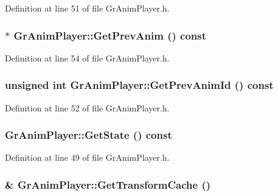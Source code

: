 \begin{CompactItemize}
Definition at line 51 of file GrAnimPlayer.h.\hypertarget{class_gr_anim_player_a549030741fea082faa485d1140bc6f7}{
\subsubsection[{GetPrevAnim}]{$\ast$ GrAnimPlayer::GetPrevAnim () const}}
\label{class_gr_anim_player_a549030741fea082faa485d1140bc6f7}




Definition at line 54 of file GrAnimPlayer.h.\hypertarget{class_gr_anim_player_cafb2a806f7e0cc45be6e97a34873002}{
\subsubsection[{GetPrevAnimId}]{\setlength{\rightskip}{0pt plus 5cm}unsigned int GrAnimPlayer::GetPrevAnimId () const}}
\label{class_gr_anim_player_cafb2a806f7e0cc45be6e97a34873002}




Definition at line 52 of file GrAnimPlayer.h.\hypertarget{class_gr_anim_player_bf5ea7dcbe01ab3f7a8e8ffc22632c19}{
\subsubsection[{GetState}]{ GrAnimPlayer::GetState () const}}
\label{class_gr_anim_player_bf5ea7dcbe01ab3f7a8e8ffc22632c19}




Definition at line 49 of file GrAnimPlayer.h.\hypertarget{class_gr_anim_player_823964a43c7ce36bd427741807c83b93}{
\subsubsection[{GetTransformCache}]{\& GrAnimPlayer::GetTransformCache ()}}
\label{class_gr_anim_player_823964a43c7ce36bd427741807c83b93}





\end{CompactItemize}
